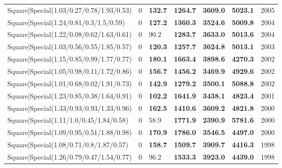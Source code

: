 \begin{tabular}{lrllllr}
 Square|Special(1.03/0.27/0.78/1.93/0.53)                      &             0   & \textbf{132.7} & \textbf{1264.7} & \textbf{3609.0} & \textbf{5023.1} &         2005 \\
 Square|Special(1.24/0.81/0.3/1.5/0.59)                        &             0   & \textbf{127.2} & \textbf{1360.3} & \textbf{3524.6} & \textbf{5009.8} &         2004 \\
 Square|Special(1.22/0.08/0.62/1.63/0.61)                      &             0   & 90.2           & \textbf{1283.7} & \textbf{3633.0} & \textbf{5013.6} &         2004 \\
 Square|Special(1.03/0.56/0.55/1.85/0.57)                      &             0   & \textbf{120.3} & \textbf{1257.7} & \textbf{3624.8} & \textbf{5013.1} &         2003 \\
 Square|Special(1.15/0.85/0.99/1.77/0.77)                      &             0   & \textbf{180.1} & \textbf{1663.4} & \textbf{3898.6} & \textbf{4270.3} &         2002 \\
 Square|Special(1.05/0.98/0.11/1.72/0.86)                      &             0   & \textbf{156.7} & \textbf{1456.2} & \textbf{3469.9} & \textbf{4929.6} &         2002 \\
 Square|Special(1.01/0.68/0.02/1.91/0.73)                      &             0   & \textbf{142.9} & \textbf{1279.2} & \textbf{3500.1} & \textbf{5088.8} &         2002 \\
 Square|Special(1.23/0.85/0.38/1.64/0.91)                      &             0   & \textbf{102.2} & \textbf{1641.9} & \textbf{3438.1} & \textbf{4823.4} &         2001 \\
 Square|Special(1.33/0.93/0.93/1.33/0.96)                      &             0   & \textbf{162.5} & \textbf{1410.6} & \textbf{3609.2} & \textbf{4821.8} &         2000 \\
 Square|Special(1.11/1.0/0.45/1.84/0.58)                       &             0   & 58.9           & \textbf{1771.9} & \textbf{2390.9} & \textbf{5781.6} &         2000 \\
 Square|Special(1.09/0.95/0.51/1.88/0.98)                      &             0   & \textbf{170.9} & \textbf{1786.0} & \textbf{3546.5} & \textbf{4497.0} &         2000 \\
 Square|Special(1.08/0.71/0.8/1.87/0.57)                       &             0   & \textbf{158.7} & \textbf{1509.7} & \textbf{3909.7} & \textbf{4416.3} &         1998 \\
 Square|Special(1.26/0.79/0.47/1.54/0.77)                      &             0   & 96.2           & \textbf{1533.3} & \textbf{3923.0} & \textbf{4439.0} &         1998 \\

\end{tabular}
